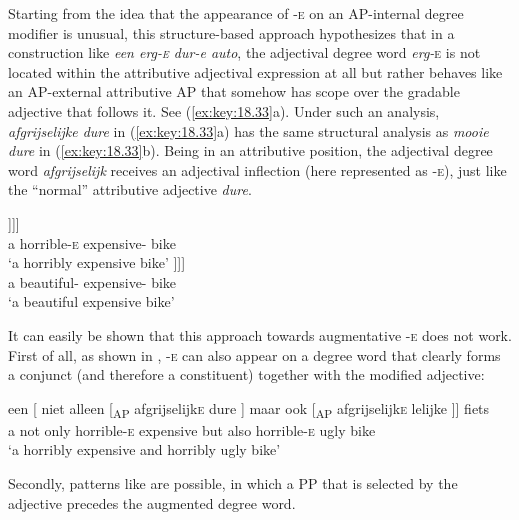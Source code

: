 \documentclass[output=paper]{langsci/langscibook}
\begin{document}
Starting from the idea that the appearance of \textsc{-e} on an AP-internal
degree modifier is unusual, this structure-based approach hypothesizes that in
a construction like \emph{een erg-\textsc{e} dur-e auto}, the adjectival degree
word \emph{erg-}\textsc{e} is not located within the attributive adjectival
expression at all but rather behaves like an AP-external attributive AP that
somehow has scope over the gradable adjective that follows it. See
(\ref{ex:key:18.33}a). Under such an analysis, \emph{afgrijselijke dure} in
(\ref{ex:key:18.33}a) has the same structural analysis as \emph{mooie dure} in
(\ref{ex:key:18.33}b). Being in an attributive position, the adjectival degree word
\emph{afgrijselijk} receives an adjectival inflection (here represented as
\textsc{-e}), just like the \enquote{normal} attributive adjective \emph{dure}.

\ea%
    \label{ex:key:18.33}
	\ea
	\gll  [\textsubscript{DP} een    [\textsubscript{NP}  afgrijselijk\textsc{-e}    [\textsubscript{NP}  dure              [\textsubscript{NP} fiets ]]]]\\
		{} a  {}                  horrible-\textsc{e}    {}        expensive-\Agr{}  {}    bike\\
	\glt \enquote*{a horribly expensive bike}
	\ex
	\gll  [\textsubscript{DP}  een    [\textsubscript{NP}  mooie        [\textsubscript{NP}  dure                [\textsubscript{NP}  fiets ]]]]\\
		{} a  {}     beautiful-\Agr{}  {}    expensive-\Agr{} {}   bike\\
	\glt \enquote*{a beautiful expensive bike}
	\z
\z

It can easily be shown that this approach towards augmentative \textsc{-e} does
not work. First of all, as shown in , \textsc{-e} can also
appear on a degree word that clearly forms a conjunct (and therefore a
constituent) together with the modified adjective:

\ea%
    \label{ex:key:18.34}
    \sn
    \gll een [ niet alleen [\textsubscript{AP} afgrijselijk\textsc{e} dure ] maar ook [\textsubscript{AP} afgrijselijk\textsc{e} lelijke ]] fiets\\
    a {} not only {} horrible-\textsc{e} expensive {} but also {} horrible-\textsc{e} ugly {} bike\\
    \glt ‘a horribly expensive and horribly ugly bike’
\z

Secondly, patterns like  are possible, in which a PP that is
selected by the adjective precedes the augmented degree word.
\end{document}
